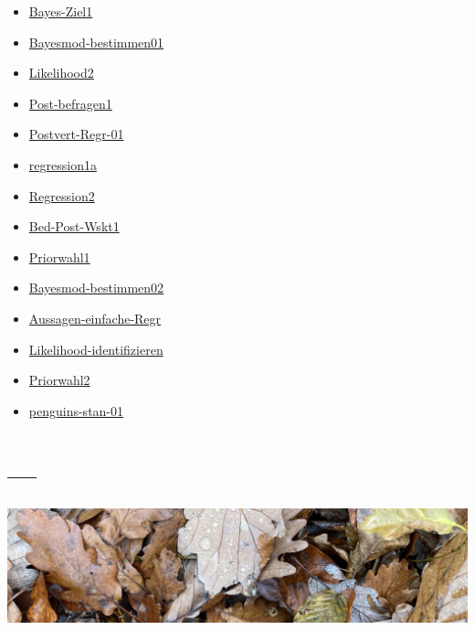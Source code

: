 \documentclass[
  a4paper,
  DIV=11]{scrreprt}
\providecommand{\tightlist}{%
  \setlength{\itemsep}{0pt}\setlength{\parskip}{0pt}}\usepackage{longtable,booktabs,array}
\theoremstyle{definition}
\theoremstyle{remark}
\begin{document}
\begin{itemize}
\tightlist
\item
  \href{https://datenwerk.netlify.app/posts/bayes-ziel1/bayes-ziel1}{Bayes-Ziel1}
\item
  \href{https://datenwerk.netlify.app/posts/bayesmod-bestimmen01/bayesmod-bestimmen01}{Bayesmod-bestimmen01}
\item
  \href{https://datenwerk.netlify.app/posts/likelihood2/likelihood2}{Likelihood2}
\item
  \href{https://datenwerk.netlify.app/posts/post-befragen1/post-befragen1}{Post-befragen1}
\item
  \href{https://datenwerk.netlify.app/posts/postvert-regr-01/postvert-regr-01}{Postvert-Regr-01}
\item
  \href{https://datenwerk.netlify.app/posts/regression1a/regression1a.html}{regression1a}
\item
  \href{https://datenwerk.netlify.app/posts/regression2/regression2}{Regression2}
\item
  \href{https://datenwerk.netlify.app/posts/bed-post-wskt1/bed-post-wskt1}{Bed-Post-Wskt1}
\item
  \href{https://datenwerk.netlify.app/posts/priorwahl1/priorwahl1}{Priorwahl1}
\item
  \href{https://datenwerk.netlify.app/posts/bayesmod-bestimmen02/bayesmod-bestimmen02}{Bayesmod-bestimmen02}
\item
  \href{https://datenwerk.netlify.app/posts/aussagen-einfache-regr/aussagen-einfache-regr}{Aussagen-einfache-Regr}
\item
  \href{https://datenwerk.netlify.app/posts/likelihood-identifizieren/likelihood-identifizieren}{Likelihood-identifizieren}
\item
  \href{https://datenwerk.netlify.app/posts/priorwahl2/priorwahl2}{Priorwahl2}
\item
  \href{https://datenwerk.netlify.app/posts/penguins-stan-01/penguins-stan-01.html}{penguins-stan-01}
\end{itemize}

\hypertarget{section-8}{%
\section{---}\label{section-8}}

\includegraphics[width=1\textwidth,height=\textheight]{./img/outro-09.jpg}
\end{document}
